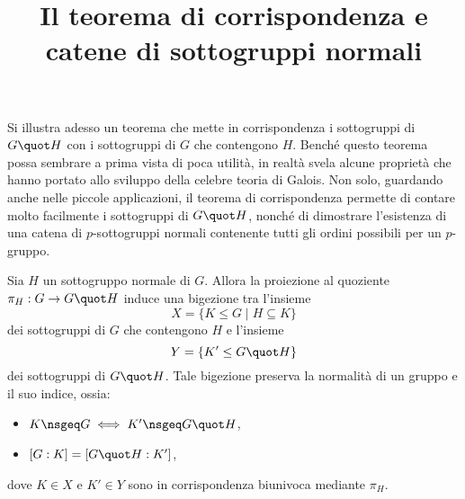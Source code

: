 \documentclass[12pt]{scrartcl}
\begin{document}
	\title{Il teorema di corrispondenza e catene di sottogruppi normali}
	\maketitle

	Si illustra adesso un teorema che mette in corrispondenza
	i sottogruppi di $G \quot H$ con i sottogruppi di $G$
	che contengono $H$. Benché questo teorema possa sembrare
	a prima vista di poca utilità, in realtà svela alcune
	proprietà che hanno portato allo sviluppo della celebre
	teoria di Galois. Non solo, guardando anche nelle piccole
	applicazioni, il teorema di corrispondenza permette di
	contare molto facilmente i sottogruppi di $G \quot H$,
	nonché di dimostrare l'esistenza di una catena di
	$p$-sottogruppi normali contenente tutti gli ordini
	possibili per un $p$-gruppo.
	
	\begin{theorem}[di corrispondenza]
		Sia $H$ un sottogruppo normale di $G$. Allora
		la proiezione al quoziente $\pi_H : G \to G \quot H$
		induce una bigezione tra l'insieme
		\[ X = \{ K \leq G \mid H \subseteq K \} \]
		dei sottogruppi di $G$ che contengono $H$ e l'insieme
		\[ Y = \{ K' \leq G \quot H \} \]
		dei sottogruppi di $G \quot H$. Tale bigezione preserva
		la normalità di un gruppo e il suo indice, ossia:
		\begin{itemize}
			\item $K \nsgeq G \iff K' \nsgeq G \quot H$,
			\item $\left[ G : K \right] = \left[ G \quot H : K' \right]$,
		\end{itemize}
		dove $K \in X$ e $K' \in Y$ sono in corrispondenza biunivoca
		mediante $\pi_H$.
	\end{theorem}
\end{document}
